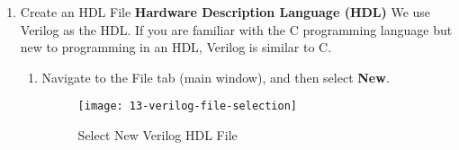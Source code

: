 \begin{flushleft}
\begin{enumerate}[
	label=\textbf{Step \arabic*.},
	leftmargin=*,
	widest={00},
	align=left]
\begin{enumerate}[
	label=\textbf{Step \arabic{enumi}\alph*.},
	leftmargin=*,
	align=left]
\begin{figure}[H]
\centering
\texttt{[image: 10-eda-tool-dialog]}
\caption{EDA Tools Dialog}
\label{fig:10-eda-tool-dialog}
\end{figure}

\item Summary
\newline
\newline
Click \textbf{Finish}.

\begin{figure}[H]
\centering
\texttt{[image: 11-summary-dialog]}
\caption{Summary Dialog}
\label{fig:11-summary-dialog}
\end{figure}

\newpage

The following screen displays.

\begin{figure}[H]
\centering
\texttt{[image: 12-project-window]}
\caption{Your First Project Window}
\label{fig:12-project-window}
\end{figure}

\end{enumerate}

\item Create an HDL File
\newline
\newline
\textbf{Hardware Description Language (HDL)}
\newline
\newline
We use Verilog as the HDL. If you are familiar with the C programming language but new to programming in an HDL, Verilog is similar to C.

\begin{enumerate}[
	label=\textbf{Step \arabic{enumi}\alph*.},
	leftmargin=*,
	align=left]

\item Navigate to the File tab (main window), and then select \textbf{New}.

\begin{figure}[H]
\centering
\texttt{[image: 13-verilog-file-selection]}
\caption{Select New Verilog HDL File}
\label{fig:13-verilog-file-selection}
\end{figure}


\end{enumerate}
\end{enumerate}
\end{flushleft}
